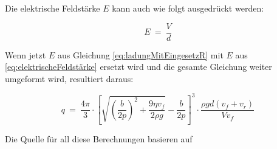 \noindent Die elektrische Feldstärke $E$ kann auch wie folgt ausgedrückt werden:

\begin{equation}\label{eq:elektrischeFeldstärke}
	E \ = \ \frac{V}{d}
\end{equation}

\noindent Wenn jetzt $E$ aus Gleichung \ref{eq:ladungMitEingesetzR} mit $E$ aus \autoref{eq:elektrischeFeldstärke} ersetzt wird und die gesamte Gleichung weiter umgeformt wird, resultiert daraus:

\begin{equation}\label{eq:letzteFormel}
	q \ = \ \frac{4\pi}{3} \cdot \left[ \sqrt{\left( \frac{b}{2p}\right)^2 + \frac{9\eta v_f}{2\rho g}} - \frac{b}{2p} \right]^3 \cdot \frac{\rho gd(v_f + v_r)}{Vv_f}
\end{equation}

\noindent Die Quelle für all diese Berechnungen basieren auf \parencite[1/2/9]{instructionManual}




	

